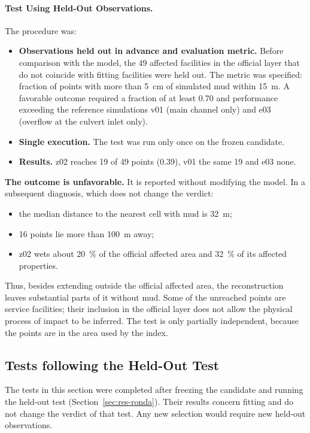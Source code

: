 \paragraph{Test Using Held-Out Observations.} The procedure was:
\begin{itemize}
\item \textbf{Observations held out in advance and evaluation metric.} Before comparison with the model, the 49 affected facilities in the official layer that do not coincide with fitting facilities were held out. The metric was specified: fraction of points with more than \SI{5}{cm} of simulated mud within \SI{15}{m}. A favorable outcome required a fraction of at least 0.70 and performance exceeding the reference simulations v01 (main channel only) and e03 (overflow at the culvert inlet only).
\item \textbf{Single execution.} The test was run only once on the frozen candidate.
\item \textbf{Results.} z02 reaches 19 of 49 points (0.39), v01 the same 19 and e03 none.
\end{itemize}
\textbf{The outcome is unfavorable.} It is reported without modifying the model. In a subsequent diagnosis, which does not change the verdict:
\begin{itemize}
\item the median distance to the nearest cell with mud is \SI{32}{m};
\item 16 points lie more than \SI{100}{m} away;
\item z02 wets about \SI{20}{\percent} of the official affected area and \SI{32}{\percent} of its affected properties.
\end{itemize}
Thus, besides extending outside the official affected area, the reconstruction leaves substantial parts of it without mud. Some of the unreached points are service facilities; their inclusion in the official layer does not allow the physical process of impact to be inferred. The test is only partially independent, because the points are in the area used by the index.

\subsection{Tests following the Held-Out Test}\label{sec:res-posterior}
The tests in this section were completed after freezing the candidate and running the held-out test (Section~\ref{sec:res-ronda}). Their results concern fitting and do not change the verdict of that test. Any new selection would require new held-out observations.

